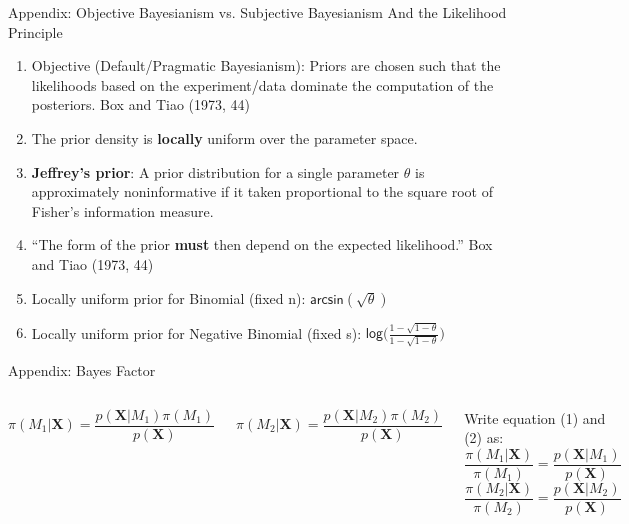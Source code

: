 \documentclass{beamer}
\begin{document}
\begin{frame}{Appendix: Objective Bayesianism vs. Subjective Bayesianism
And the Likelihood Principle}
 
 \begin{enumerate}
 \item Objective (Default/Pragmatic Bayesianism): Priors are chosen such that the likelihoods based on the experiment/data dominate the computation of the posteriors. Box and Tiao (1973, 44)
 \item The prior density is \textbf{locally} uniform over the parameter space.
   \item \textbf{Jeffrey's prior}: A prior distribution for a single parameter $\theta$ is approximately noninformative if it taken proportional to the square root of Fisher's information measure.
   \item ``The form of the prior \textbf{must} then depend on the expected likelihood.'' Box and Tiao (1973, 44)
   \item Locally uniform prior for Binomial (fixed n): $\textsf{arcsin}(\sqrt{\theta})$
   \item Locally uniform prior for Negative Binomial (fixed s): $\textsf{log}\big(\frac{1 - \sqrt{1 - \theta}}{1 - \sqrt{1 - \theta}}\big)$
 \end{enumerate}
 
\end{frame}

\begin{frame}{Appendix: Bayes Factor}
        \begin{columns}[t, onlytextwidth]
                \begin{equation}
\pi(M_{1} | \boldsymbol{X}) = \frac{p(\boldsymbol{X} | M_{1}) \pi(M_{1})}{p(\boldsymbol{X})}
\end{equation}

\begin{equation}
\pi(M_{2} | \boldsymbol{X}) = \frac{p(\boldsymbol{X} | M_{2}) \pi(M_{2})}{p(\boldsymbol{X})} 
\end{equation}
            
Write equation (1) and (2) as:
\begin{equation}
\frac{\pi(M_{1} | \boldsymbol{X})}{\pi(M_{1})} = \frac{p(\boldsymbol{X} | M_{1})}{p(\boldsymbol{X})}
\end{equation}
\begin{equation}
\frac{\pi(M_{2} | \boldsymbol{X})}{\pi(M_{2})} = \frac{p(\boldsymbol{X} | M_{2})}{p(\boldsymbol{X})}
\end{equation}
\end{columns}
\end{frame}
\end{document}
